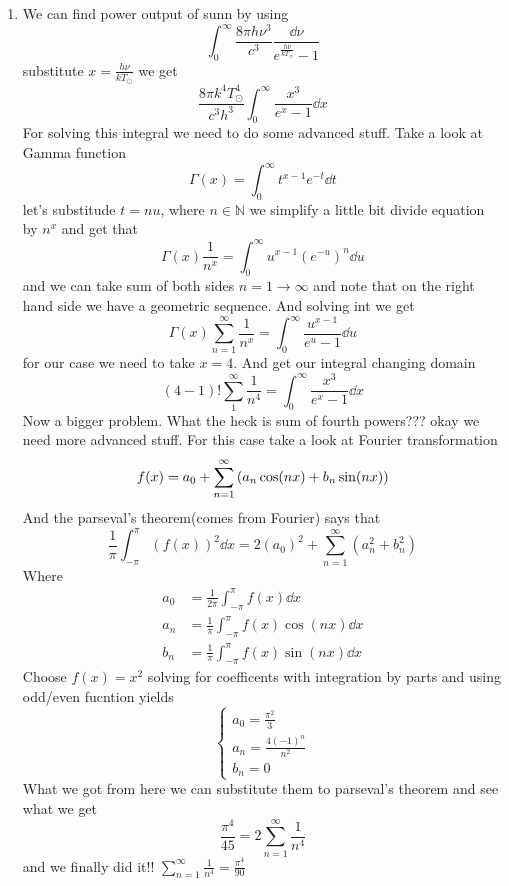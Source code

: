 \begin{sol}
    \begin{enumerate}[label=\textbf{(\alph*)}]
        
        \item 
        We can find power output of sunn by using $$\int_0^\infty\frac{8\pi h\nu^3}{c^3}\frac{\dd \nu}{e^{\frac{h\nu}{kT_\odot}}-1}$$
        substitute $x=\frac{h\nu}{kT_\odot}$ we get 
        $$\frac{8\pi k^4T_\odot^4}{c^3h^3}\int_0^\infty\frac{x^3}{e^x-1}\dd x$$
        For solving this integral we need to do some advanced stuff. Take a look at Gamma function
        $$\Gamma(x)=\int_0^\infty t^{x-1}e^{-t}\dd t$$ let's substitude $t=nu$, where $n\in\mathbb{N}$
        we simplify a little bit divide equation by $n^x$ and get that $$\Gamma(x)\frac{1}{n^x}=\int_0^\infty u^{x-1}(e^{-u})^n \dd u$$
        and we can take sum of both sides $n=1\to\infty$ and note that on the right hand side we have a geometric sequence. And solving int we get 
        $$\Gamma(x)\sum_{n=1}^\infty\frac{1}{n^x}=\int_0^\infty\frac{u^{x-1}}{e^u-1}\dd u$$ for our case we need to take $x=4$. And get our integral changing domain 
        $$(4-1)!\sum_1^\infty\frac{1}{n^4}=\int_0^\infty\frac{x^3}{e^x-1}\dd x$$ Now a bigger problem. What the heck is sum of fourth powers??? okay we need more advanced stuff. For this case take a look at Fourier transformation
        $$f(x)=a_0+\sum_{n=1}^\infty\qty(a_n\cos(nx)+b_n\sin(nx))$$
        And the parseval's theorem(comes from Fourier) says that $$\frac{1}{\pi}\int_{-\pi}^\pi (f(x))^2\dd x=2(a_0)^2+\sum_{n=1}^\infty (a_n^2+b_n^2)$$
        Where \begin{align*}
            a_0&=\frac{1}{2\pi}\int_{-\pi}^\pi f(x)\dd x\\
            a_n&=\frac{1}{\pi}\int_{-\pi}^\pi f(x)\cos(nx)\dd x\\
            b_n&=\frac{1}{\pi}\int_{-\pi}^\pi f(x)\sin(nx)\dd x
        \end{align*}
        Choose $f(x)=x^2$ solving for coefficents with integration by parts and using odd/even fucntion yields
        $$\begin{cases}
            a_0=\frac{\pi^2}{3}\\
            a_n=\frac{4(-1)^n}{n^2}\\
            b_n=0
        \end{cases}$$
        What we got from here we can substitute them to parseval's theorem and see what we get
        $$\frac{\pi^4}{45}=2\sum_{n=1}^\infty\frac{1}{n^4}$$
        and we finally did it!! $\sum_{n=1}^\infty\frac{1}{n^4}=\frac{\pi^4}{90}$

\end{enumerate}
\end{sol}
